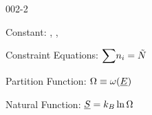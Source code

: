 \begin{mitframe}{002-2} %

    
	\begin{listone}
    
    	\item Constant: \nummoles, \uline{\vol}, \uline{\energy}
    
    	\item Constraint Equations: $\mathlarger\sum\nolimits \molspecies{i} = \totmoles$ 
    
           
    	\item Partition Function: $\mpc \equiv \mpf(\uline{\energy})$
    
           
    	\item Natural Function: $\uline{\entropy} = \boltz\ln\mpc$
    
    
    
	\end{listone}			

\end{mitframe}